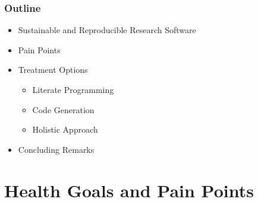 \documentclass[usenames,dvipsnames]{beamer}
\begin{document}
\begin{frame}

\frametitle{Outline}

\begin{itemize}
  \item Sustainable and Reproducible Research Software %
  \item Pain Points
  \item Treatment Options
  \begin{itemize}
    \item Literate Programming %
    \item Code Generation
    \item Holistic Approach
  \end{itemize}
  \item Concluding Remarks
\end{itemize}

  
\end{frame}


\section[Health Goals]{Health Goals and Pain Points}

\end{document}
